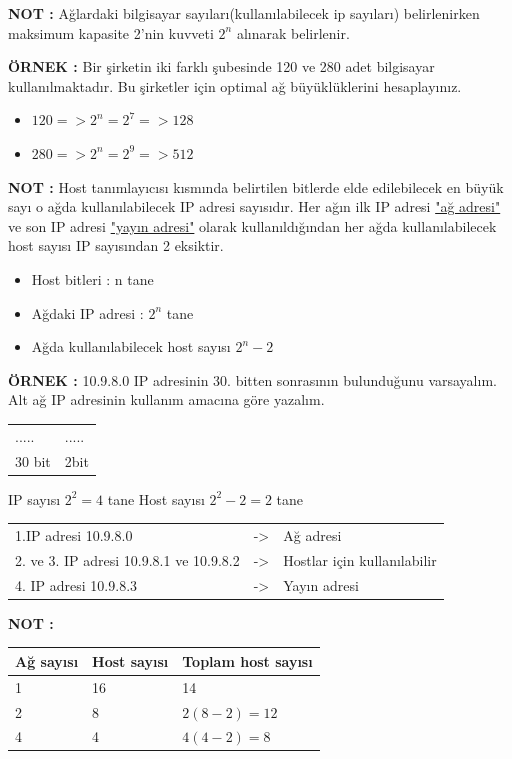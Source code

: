\textbf{NOT : }Ağlardaki bilgisayar sayıları(kullanılabilecek ip sayıları) belirlenirken maksimum kapasite 2'nin kuvveti ${2^n}$ %
alınarak belirlenir. 

\textbf{ÖRNEK : }Bir şirketin iki farklı şubesinde 120 ve 280 adet bilgisayar kullanılmaktadır. Bu şirketler için optimal ağ büyüklüklerini hesaplayınız. 

\begin{itemize}
\item[]$120 => 2^n = 2^7 => 128$
\item[]$280 => 2^n = 2^9 => 512$
\end{itemize}

\textbf{NOT : }Host tanımlayıcısı kısmında belirtilen bitlerde elde edilebilecek en büyük sayı o ağda kullanılabilecek IP adresi sayısıdır. Her ağın ilk IP adresi \underline{"ağ adresi"} ve son IP adresi \underline{"yayın adresi"} olarak kullanıldığından her ağda kullanılabilecek host sayısı IP sayısından 2 eksiktir.
\begin{itemize}
\item[] Host bitleri : n tane 
\item[] Ağdaki IP adresi : $2^n$ tane 
\item[] Ağda kullanılabilecek host sayısı $2^n-2$
\end{itemize}

\textbf{ÖRNEK : } 10.9.8.0 IP adresinin 30. bitten sonrasının bulunduğunu varsayalım. Alt ağ IP adresinin kullanım amacına göre yazalım. 

\begin{tabular}{ll}
..... & ..... \\
30 bit& 2bit\\
\end{tabular}

IP sayısı $2^2=4$ tane
Host sayısı $2^2-2=2$ tane


\begin{tabular}{lll}
1.IP adresi 10.9.8.0 & ->& Ağ adresi \\
2. ve 3. IP adresi 10.9.8.1 ve 10.9.8.2 & -> & Hostlar için kullanılabilir\\
4. IP adresi 10.9.8.3 & -> & Yayın adresi 
\end{tabular}

\textbf{NOT : }

\begin{tabular}{ll|l}
Ağ sayısı & Host sayısı &Toplam host sayısı\\
\hline 
1&16&14\\
2&8&$2(8-2) =12$ \\
4&4&$4(4-2) = 8$\\
\end{tabular}


